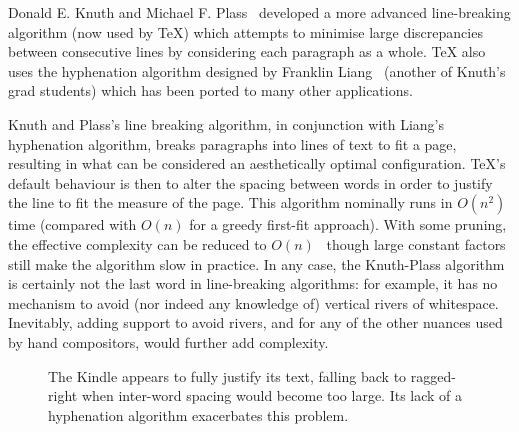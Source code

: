 Donald E. Knuth and Michael F. Plass~\cite{Knuth1981} developed a more advanced line-breaking algorithm (now used by \TeX{}) which attempts to minimise large discrepancies between consecutive lines by considering each paragraph as a whole. \TeX{} also uses the hyphenation algorithm designed by Franklin Liang~\cite{Liang1983} (another of Knuth's grad students) which has been ported to many other applications.

Knuth and Plass's line breaking algorithm, in conjunction with Liang's hyphenation algorithm, breaks paragraphs into lines of text to fit a page, resulting in what can be considered an aesthetically optimal configuration. \TeX 's default behaviour is then to alter the spacing between words in order to justify the line to fit the measure of the page. This algorithm nominally runs in $O(n^2)$ time (compared with $O(n)$ for a greedy first-fit approach). With some pruning, the effective complexity can be reduced to $O(n)$~\cite{Hirschberg1987,Eppstein1992,Hurst2009} though large constant factors still make the algorithm slow in practice. In any case, the Knuth-Plass algorithm is certainly not the last word in line-breaking algorithms: for example, it has no mechanism to avoid (nor indeed any knowledge of) vertical rivers of whitespace.~\cite{Mittelbach1992} Inevitably, adding support to avoid rivers, and for any of the other nuances used by hand compositors, would further add complexity.

\begin{figure}
    \centering
    \caption[Poor typography on the Kindle]{The Kindle appears to fully justify its text, falling back to ragged-right when inter-word spacing would become too large. Its lack of a hyphenation algorithm exacerbates this problem.}
    \label{fig:crapkindle}
\end{figure}

